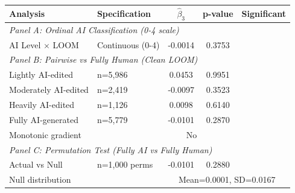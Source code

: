\begin{tabular}{llccc}
\toprule
\textbf{Analysis} & \textbf{Specification} & $\hat{\beta}_3$ & \textbf{p-value} & \textbf{Significant} \\
\midrule
\multicolumn{5}{l}{\textit{Panel A: Ordinal AI Classification (0-4 scale)}} \\
\midrule
AI Level $\times$ LOOM & Continuous (0-4) & -0.0014 & 0.3753 &  \\
\midrule
\multicolumn{5}{l}{\textit{Panel B: Pairwise vs Fully Human (Clean LOOM)}} \\
\midrule
Lightly AI-edited & n=5,986 & 0.0453 & 0.9951 &  \\
Moderately AI-edited & n=2,419 & -0.0097 & 0.3523 &  \\
Heavily AI-edited & n=1,126 & 0.0098 & 0.6140 &  \\
Fully AI-generated & n=5,779 & -0.0101 & 0.2870 &  \\
Monotonic gradient & \multicolumn{4}{c}{No} \\
\midrule
\multicolumn{5}{l}{\textit{Panel C: Permutation Test (Fully AI vs Fully Human)}} \\
\midrule
Actual vs Null & n=1,000 perms & -0.0101 & 0.2880 &  \\
Null distribution & & \multicolumn{3}{c}{Mean=0.0001, SD=0.0167} \\
\bottomrule
\end{tabular}